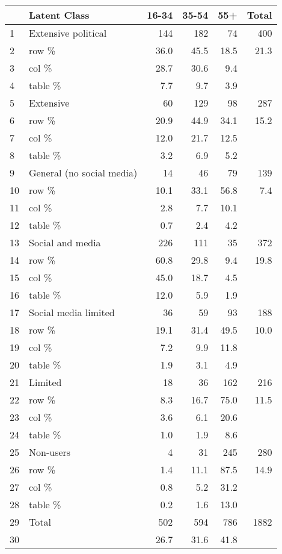 \documentclass{article}
\begin{document}
\begin{table}[ht]
\centering
\begin{tabular}{llrrrr}
  \hline
 & Latent Class & 16-34 & 35-54 & 55+ & Total \\ 
  \hline
1 & Extensive political & 144 & 182 & 74 & 400 \\ 
  2 & row \% & 36.0 & 45.5 & 18.5 & 21.3 \\ 
  3 & col \% & 28.7 & 30.6 & 9.4 &  \\ 
  4 & table \% & 7.7 & 9.7 & 3.9 &  \\ 
  5 & Extensive & 60 & 129 & 98 & 287 \\ 
  6 & row \% & 20.9 & 44.9 & 34.1 & 15.2 \\ 
  7 & col \% & 12.0 & 21.7 & 12.5 &  \\ 
  8 & table \% & 3.2 & 6.9 & 5.2 &  \\ 
  9 & General (no social media) & 14 & 46 & 79 & 139 \\ 
  10 & row \% & 10.1 & 33.1 & 56.8 & 7.4 \\ 
  11 & col \% & 2.8 & 7.7 & 10.1 &  \\ 
  12 & table \% & 0.7 & 2.4 & 4.2 &  \\ 
  13 & Social and media & 226 & 111 & 35 & 372 \\ 
  14 & row \% & 60.8 & 29.8 & 9.4 & 19.8 \\ 
  15 & col \% & 45.0 & 18.7 & 4.5 &  \\ 
  16 & table \% & 12.0 & 5.9 & 1.9 &  \\ 
  17 & Social media limited & 36 & 59 & 93 & 188 \\ 
  18 & row \% & 19.1 & 31.4 & 49.5 & 10.0 \\ 
  19 & col \% & 7.2 & 9.9 & 11.8 &  \\ 
  20 & table \% & 1.9 & 3.1 & 4.9 &  \\ 
  21 & Limited & 18 & 36 & 162 & 216 \\ 
  22 & row \% & 8.3 & 16.7 & 75.0 & 11.5 \\ 
  23 & col \% & 3.6 & 6.1 & 20.6 &  \\ 
  24 & table \% & 1.0 & 1.9 & 8.6 &  \\ 
  25 & Non-users & 4 & 31 & 245 & 280 \\ 
  26 & row \% & 1.4 & 11.1 & 87.5 & 14.9 \\ 
  27 & col \% & 0.8 & 5.2 & 31.2 &  \\ 
  28 & table \% & 0.2 & 1.6 & 13.0 &  \\ 
  29 & Total & 502 & 594 & 786 & 1882 \\ 
  30 &  & 26.7 & 31.6 & 41.8 &  \\ 
   \hline
\end{tabular}
\end{table}
\end{document}
